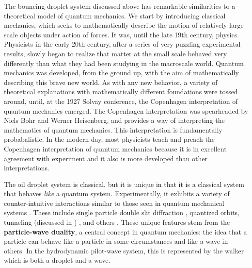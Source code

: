 The bouncing droplet system discussed above has remarkable similarities to a theoretical model of quantum mechanics. We start by introducing classical mechanics, which seeks to mathematically describe the motion of relatively large scale objects under action of forces. It was, until the late 19th century, physics. Physicists in the early 20th century, after a series of very puzzling experimental results, slowly began to realize that matter at the small scale behaved very differently than what they had been studying in the macroscale world. Quantum mechanics was developed, from the ground up, with the aim of mathematically describing this brave new world. As with any new behavior, a variety of theoretical explanations with mathematically different foundations were tossed around, until, at the 1927 Solvay conference, the Copenhagen interpretation of quantum mechanics emerged. The Copenhagen interpretation was spearheaded by Niels Bohr and Werner Heisenberg, and provides a way of interpreting the mathematics of quantum mechanics. This interpretation is fundamentally probabalistic. In the modern day, most physicists teach and preach the Copenhagen interpretation of quantum mechanics because it is in excellent agreement with experiment and it also is more developed than other interpretations.

The oil droplet system is classical, but it is unique in that it is a classical system that behaves \textit{like} a quantum system. Experimentally, it exhibits a variety of counter-intuitive interactions similar to those seen in quantum mechanical systems . These include single particle double slit diffraction , quantized orbits, tunneling (discussed in ) , and others . These unique features stem from the \textbf{particle-wave duality}, a central concept in quantum mechanics: the idea that a particle can behave like a particle in some circumstances and like a wave in others. In the hydrodynamic pilot-wave system, this is represented by the walker which is both a droplet and a wave.

